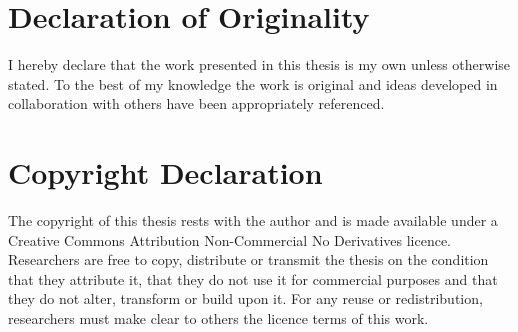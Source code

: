 \cleardoublepage{}
{}\mtcaddchapter 
\chapter*{Declaration of Originality}
\addtocounter{counter}{-1}




I hereby declare that the work presented in this thesis is my own unless otherwise stated. To the best of my knowledge the work is original and ideas developed in collaboration with others have been appropriately referenced.


\cleardoublepage{}
{}\mtcaddchapter 
\chapter*{Copyright Declaration}
\addtocounter{counter}{-1}


The copyright of this thesis rests with the author and is made available under a Creative Commons Attribution Non-Commercial No Derivatives licence. Researchers are free to copy, distribute or transmit the thesis on the condition that they attribute it, that they do not use it for commercial purposes and that they do not alter, transform or build upon it. For any reuse or redistribution, researchers must make clear to others the licence terms of this work.